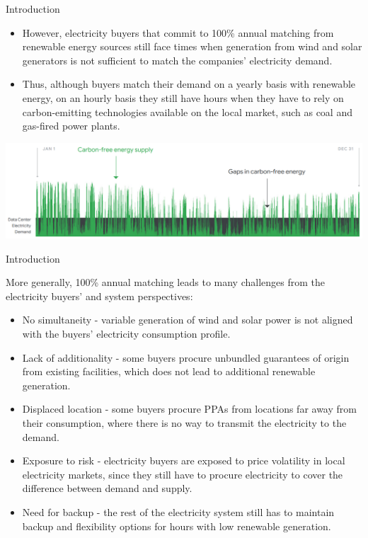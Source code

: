 \begin{frame}{Introduction}
  
    \begin{itemize}
    \item However, electricity buyers that commit to 100\% annual matching 
    from renewable energy sources still face times when generation 
    from wind and solar generators is not sufficient to match 
    the companies’ electricity demand. 
    \item Thus, although buyers match their demand on a \alert{yearly} basis with 
    renewable energy, on an \alert{hourly} basis they still have hours 
    when they have to rely on carbon-emitting technologies available 
    on the local market, such as coal and gas-fired power plants.
    \end{itemize}

  \centering
  \includegraphics[width=14cm]{images/google-year.png}
           
\end{frame}



\begin{frame}{Introduction}
  
  More generally, 100\% annual matching leads to many challenges 
  from the electricity buyers' and system perspectives: 
  \begin{itemize}
  \item No \alert{simultaneity} - variable generation of wind and solar power is not aligned with the 
  buyers' electricity consumption profile.
  \item Lack of \alert{additionality} - some buyers procure unbundled guarantees of origin from existing 
  facilities, which does not lead to additional renewable generation.
  \item Displaced \alert{location} - some buyers procure PPAs from locations far away 
  from their consumption, where there is no way to transmit the electricity to the demand.
  \item Exposure to \alert{risk} - electricity buyers are exposed to price volatility 
  in local electricity markets, since they still have to procure electricity to cover
  the difference between demand and supply.
  \item Need for \alert{backup} - the rest of the electricity system still has to 
  maintain backup and flexibility options for hours with low renewable generation.
  \end{itemize}
  
\end{frame}



